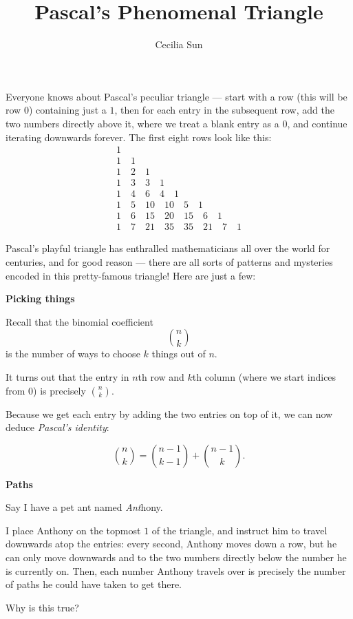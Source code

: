 \documentclass{article}
\title{Pascal’s Phenomenal Triangle}
\author{Cecilia Sun}
\begin{document}
\maketitle
Everyone knows about Pascal’s peculiar triangle --- start with a row (this will be row $0$) containing just a $1$, then for each entry in the subsequent row, add the two numbers directly above it, where we treat a blank entry as a $0$, and continue iterating downwards forever. The first eight rows look like this:
\[\begin{array}{c}1\\1\quad 1\\1\quad 2\quad 1\\1\quad 3\quad 3\quad 1\\1\quad 4\quad 6\quad 4\quad 1\\1\quad 5\quad 10\quad 10\quad 5\quad 1\\1\quad 6\quad 15\quad 20\quad 15\quad 6\quad 1\\1\quad 7\quad 21\quad 35\quad 35\quad 21\quad 7\quad 1\end{array}\] %

Pascal’s playful triangle has enthralled mathematicians all over the world for centuries, and for good reason --- there are all sorts of patterns and mysteries encoded in this pretty-famous triangle! Here are just a few:

\textbf{Picking things}

Recall that the binomial coefficient 
\[
	\binom nk
\]
is the number of ways to choose $k$ things out of $n$. 

It turns out that the entry in $n$th row and $k$th column (where we start indices from $0$) is precisely $\binom nk$.

Because we get each entry by adding the two entries on top of it, we can now deduce \textit{Pascal's identity}:

\[\binom nk=\binom{n-1}{k-1}+\binom{n-1}k.\]

\textbf{Paths}

Say I have a pet ant named \textit{Ant}hony. 

I place Anthony on the topmost $1$ of the triangle, and instruct him to travel downwards atop the entries: every second, Anthony moves down a row, but he can only move downwards and to the two numbers directly below the number he is currently on.
Then, each number Anthony travels over is precisely the number of paths he could have taken to get there. 

Why is this true? 
\end{document}
